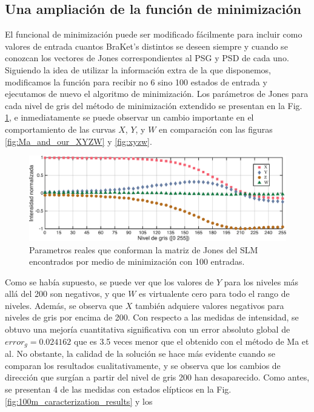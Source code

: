 \subsection{Una ampliación de la función de minimización}
El funcional de minimización puede ser modificado
fácilmente para incluir como valores de entrada cuantos BraKet's
distintos se deseen siempre y cuando se conozcan los vectores de Jones 
correspondientes al PSG y PSD de cada uno.   
Siguiendo la idea de utilizar la información extra de la que disponemos, modificamos la
función para recibir no 6 sino 100 estados de entrada y 
ejecutamos de nuevo el algoritmo de minimización. Los parámetros de
Jones para cada nivel de gris del método de minimización extendido
se presentan en la Fig. \ref{fig:xyzw_100}, e inmediatamente se puede observar un
cambio importante en el comportamiento de las curvas $X$, $Y$, y $W$
en comparación con las figuras \ref{fig:Ma_and_our_XYZW} y
\ref{fig:xyzw}. 
\begin{figure}[h!]
\centering
\includegraphics[scale=.55]{xyzw_100.pdf}
\caption[Parametros reales que conforman la matriz de Jones del
SLM encontrados por minimización con 100 medidas]{Parametros reales
  que conforman la matriz de Jones del SLM 
  encontrados por medio de minimización con 100 entradas.}
\label{fig:xyzw_100}
\end{figure}
Como se había supuesto, se puede ver que los valores de $Y$
para los niveles más allá del 200 son negativos, y que $W$ es
virtualente cero para todo el rango de niveles. Además, se observa que
$X$ también adquiere valores negativos para niveles de gris por encima
de 200.   
Con respecto a las medidas de intensidad, se obtuvo una mejoría cuantitativa
significativa con un error absoluto global de $error_g= 0.024162$ que
es 3.5 veces menor que el obtenido con el método de Ma et al. No
obstante, la calidad de la solución se hace más evidente cuando se
comparan los resultados cualitativamente, y se observa que los cambios
de dirección que surgían a partir del nivel de gris 200 han
desaparecido. Como antes, se presentan 4 de las medidas con estados
elípticos en la Fig. \ref{fig:100m_caracterization_results} y los
